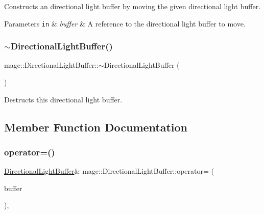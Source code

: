 Constructs an directional light buffer by moving the given directional light buffer.


\begin{DoxyParams}[1]{Parameters}
\mbox{\tt in}  & {\em buffer} & A reference to the directional light buffer to move. \\
\hline
\end{DoxyParams}
\hypertarget{structmage_1_1_directional_light_buffer_a6d9c1eb4b4b15c586524e5436d9d6162}{}\label{structmage_1_1_directional_light_buffer_a6d9c1eb4b4b15c586524e5436d9d6162} 
\subsubsection{\texorpdfstring{$\sim$\+Directional\+Light\+Buffer()}{~DirectionalLightBuffer()}}
{\footnotesize\ttfamily mage\+::\+Directional\+Light\+Buffer\+::$\sim$\+Directional\+Light\+Buffer (\begin{DoxyParamCaption}{ }\end{DoxyParamCaption})\hspace{0.3cm}{\ttfamily [default]}}

Destructs this directional light buffer. 

\subsection{Member Function Documentation}
\hypertarget{structmage_1_1_directional_light_buffer_acb72dcc486af689b5f189bfc68e350cb}{}\label{structmage_1_1_directional_light_buffer_acb72dcc486af689b5f189bfc68e350cb} 
\subsubsection{\texorpdfstring{operator=()}{operator=()}\hspace{0.1cm}{\footnotesize\ttfamily [1/2]}}
{\footnotesize\ttfamily \hyperlink{structmage_1_1_directional_light_buffer}{Directional\+Light\+Buffer}\& mage\+::\+Directional\+Light\+Buffer\+::operator= (\begin{DoxyParamCaption}\item[{const \hyperlink{structmage_1_1_directional_light_buffer}{Directional\+Light\+Buffer} \&}]{buffer }\end{DoxyParamCaption})\hspace{0.3cm}{\ttfamily [default]}, {\ttfamily [noexcept]}}

